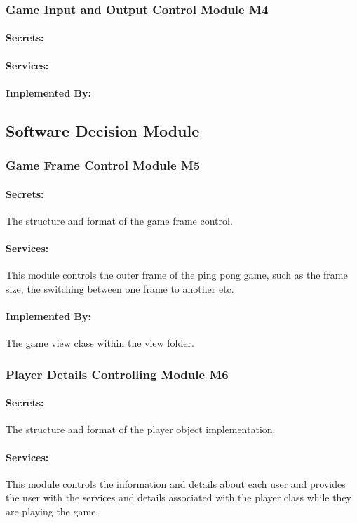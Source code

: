 \documentclass[12pt,letterpaper]{article}
\begin{document}
	\subsubsection{Game Input and Output Control Module M4}
	\paragraph{Secrets: } 
	\paragraph{Services: } 
	\paragraph{Implemented By: } 

	\subsection{Software Decision Module}

	\subsubsection{Game Frame Control Module M5}
	\paragraph{Secrets: } The structure and format of the game frame control.
	\paragraph{Services: }This module controls the outer frame of the ping pong game, such as the frame size, the switching between one frame to another etc. 
	\paragraph{Implemented By: } The game view class within the view folder.

	\subsubsection{Player Details Controlling Module M6}
	\paragraph{Secrets: } The structure and format of the player object implementation.
	\paragraph{Services: } This module controls the information and details about each user and provides the user with the services and details associated with the player class while they are playing the game.
\end{document}
